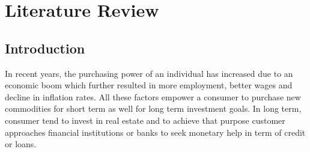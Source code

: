 %
%
%
%

\chapter{Literature Review}\label{C.LitReview}
\section{Introduction}\label{S.intro3}

In recent years, the purchasing power of an individual has increased due to an economic boom which further resulted in more employment, better wages and decline in inflation rates. All these factors empower a consumer to purchase new commodities for short term as well for long term investment goals. In long term, consumer tend to invest in real estate and to achieve that purpose customer approaches financial institutions or banks to seek monetary help in term of credit or loans.\\

